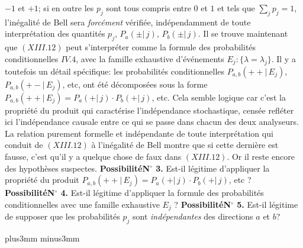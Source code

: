 $-1$ et $+1$; si en outre les $p_j$ sont tous compris entre $0$ et $1$ et
tels que $\sum_j p_j = 1$,   l'in\'egalit\'e de Bell sera {\it forc\'ement}
v\'erifi\'ee, ind\'ependamment de toute interpr\'etation des quantit\'es
$p_j$,  $P_{a}(\pm|\, j)$, $P_{b}(\pm|\, j)$.
\medskip
Il se trouve maintenant que $(XIII.12)$ peut s'interpr\'eter comme la
formule des probabilit\'es conditionnelles $IV.4$, avec la famille
exhaustive d'\'ev\'enements $E_j : \{ \lambda = \lambda_j\}$. Il y a
toutefois un d\'etail sp\'ecifique: les probabilit\'es conditionnelles
$P_{a,b}(++ |\, E_j)$,  $P_{a,b}(+- |\, E_j)$, etc, ont \'et\'e 
d\'ecompos\'ees sous la forme $P_{a,b}(++ |\, E_j) = P_{a}(+ |\, j)
\cdot P_{b}(+ |\, j)$, etc. Cela semble logique car c'est la propri\'et\'e
du produit qui  caract\'erise l'ind\'ependance stochastique, cens\'ee
refl\'eter ici l'ind\'ependance causale entre ce qui se passe dans chacun
des deux analyseurs.
\medskip
La relation purement formelle et ind\'ependante de toute interpr\'etation
qui conduit de $(XIII.12)$ \`a l'in\'egalit\'e de Bell montre que si cette
derni\`ere est fausse, c'est qu'il y a quelque chose de faux dans $(XIII.12)$.
Or il reste encore des hypoth\`eses suspectes. 
\smallskip
{\bf Possibilit\'e\a\a N${}^{\circ}\!\!\!$ 3.} Est-il l\'egitime
d'appliquer la propri\'et\'e du produit $P_{a,b}(++ |\, E_j) =
P_{a}(+ |\, j) \cdot P_{b}(+ |\, j)$, etc ?
\smallskip
{\bf Possibilit\'e\a\a N${}^{\circ}\!\!$ 4.} Est-il l\'egitime
d'appliquer la formule des probabilit\'es conditionnelles avec une
famille exhaustive $E_j$ ?
\smallskip
{\bf Possibilit\'e\a\a N${}^{\circ}\!\!$ 5.} Est-il l\'egitime de
supposer que les probabilit\'es $p_j$ sont {\it ind\'ependantes} des
directions $a$ et $b$?
 

\vskip6mm plus3mm minus3mm
 

